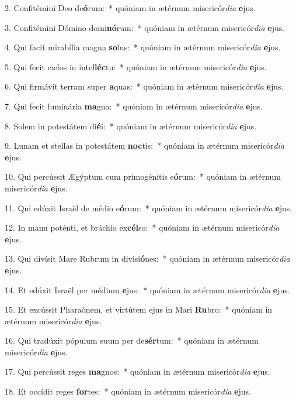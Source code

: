 2. Confitémini Deo de\textbf{ó}rum:~*  quóniam in ætérnum misericór\textit{di}\textit{a} \textbf{e}jus.\

3. Confitémini Dómino domi\textbf{nó}rum:~*  quóniam in ætérnum misericór\textit{di}\textit{a} \textbf{e}jus.\

4. Qui facit mirabília magna \textbf{so}lus:~*  quóniam in ætérnum misericór\textit{di}\textit{a} \textbf{e}jus.\

5. Qui fecit cælos in intel\textbf{léc}tu:~*  quóniam in ætérnum misericór\textit{di}\textit{a} \textbf{e}jus.\

6. Qui firmávit terram super \textbf{a}quas:~*  quóniam in ætérnum misericór\textit{di}\textit{a} \textbf{e}jus.\

7. Qui fecit luminária \textbf{ma}gna:~*  quóniam in ætérnum misericór\textit{di}\textit{a} \textbf{e}jus.\

8. Solem in potestátem di\textbf{é}i:~*  quóniam in ætérnum misericór\textit{di}\textit{a} \textbf{e}jus.\

9. Lunam et stellas in potestátem \textbf{noc}tis:~*  quóniam in ætérnum misericór\textit{di}\textit{a} \textbf{e}jus.\

10. Qui percússit Ægýptum cum primogénitis e\textbf{ó}rum:~*  quóniam in ætérnum misericór\textit{di}\textit{a} \textbf{e}jus.\

11. Qui edúxit Israël de médio e\textbf{ó}rum:~*  quóniam in ætérnum misericór\textit{di}\textit{a} \textbf{e}jus.\

12. In manu poténti, et bráchio ex\textbf{cél}so:~*  quóniam in ætérnum misericór\textit{di}\textit{a} \textbf{e}jus.\

13. Qui divísit Mare Rubrum in divisi\textbf{ó}nes:~*  quóniam in ætérnum misericór\textit{di}\textit{a} \textbf{e}jus.\

14. Et edúxit Israël per médium \textbf{e}jus:~*  quóniam in ætérnum misericór\textit{di}\textit{a} \textbf{e}jus.\

15. Et excússit Pharaónem, et virtútem ejus in Mari \textbf{Ru}bro:~*  quóniam in ætérnum misericór\textit{di}\textit{a} \textbf{e}jus.\

16. Qui tradúxit pópulum suum per de\textbf{sér}tum:~*  quóniam in ætérnum misericór\textit{di}\textit{a} \textbf{e}jus.\

17. Qui percússit reges \textbf{ma}gnos:~*  quóniam in ætérnum misericór\textit{di}\textit{a} \textbf{e}jus.\

18. Et occídit reges \textbf{for}tes:~*  quóniam in ætérnum misericór\textit{di}\textit{a} \textbf{e}jus.\

